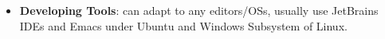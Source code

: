 \documentclass{resume}
\begin{document}
\begin{itemize}[parsep=0.25ex]

  \item \textbf{Developing Tools}:
    can adapt to any editors/OSs, usually use JetBrains IDEs and Emacs under Ubuntu
    and Windows Subsystem of Linux.
\end{itemize}

\end{document}
